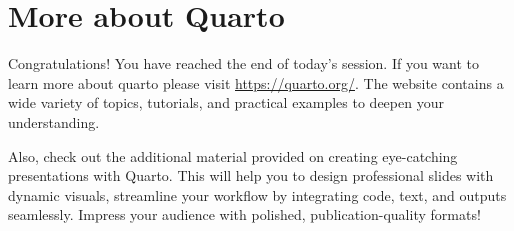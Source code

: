 \documentclass[
  letterpaper,
  DIV=11,
  numbers=noendperiod]{scrartcl}
\begin{document}
\section{More about Quarto}\label{more-about-quarto}

Congratulations! You have reached the end of today's session. If you
want to learn more about quarto please visit \url{https://quarto.org/}.
The website contains a wide variety of topics, tutorials, and practical
examples to deepen your understanding.

Also, check out the additional material provided on creating
eye-catching presentations with Quarto. This will help you to design
professional slides with dynamic visuals, streamline your workflow by
integrating code, text, and outputs seamlessly. Impress your audience
with polished, publication-quality formats!
\end{document}
